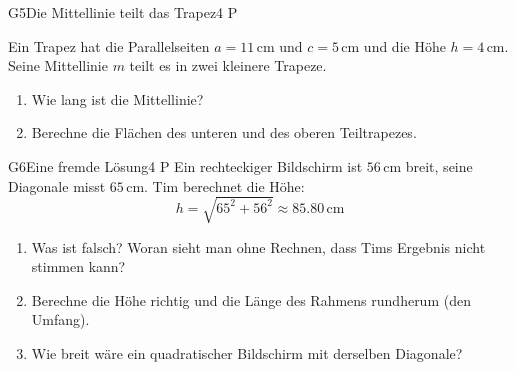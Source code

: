 \documentclass[11pt]{article}
\begin{document}
\begin{lpaufgabe}{G5}{Die Mittellinie teilt das Trapez}{4 P}
\begin{minipage}[t]{0.56\linewidth}\vspace{0pt}
Ein Trapez hat die Parallelseiten $a = 11\,\text{cm}$ und $c = 5\,\text{cm}$ und die Höhe $h = 4\,\text{cm}$. Seine
Mittellinie $m$ teilt es in zwei kleinere Trapeze.
\begin{enumerate}[label=(\alph*),leftmargin=*,itemsep=2pt]
\item Wie lang ist die Mittellinie?
\item Berechne die Flächen des unteren und des oberen Teiltrapezes.
\end{enumerate}
\end{minipage}\hfill
\begin{minipage}[t]{0.40\linewidth}\vspace{0pt}\centering
{}
\end{minipage}
\end{lpaufgabe}

\begin{lpaufgabe}{G6}{Eine fremde Lösung}{4 P}
Ein rechteckiger Bildschirm ist $56\,\text{cm}$ breit, seine Diagonale misst $65\,\text{cm}$. Tim berechnet die Höhe:
\[ h = \sqrt{65^2 + 56^2} \approx 85.80\,\text{cm} \]
\begin{enumerate}[label=(\alph*),leftmargin=*,itemsep=2pt]
\item Was ist falsch? Woran sieht man ohne Rechnen, dass Tims Ergebnis nicht stimmen kann?
\item Berechne die Höhe richtig und die Länge des Rahmens rundherum (den Umfang).
\item Wie breit wäre ein quadratischer Bildschirm mit derselben Diagonale?
\end{enumerate}
\end{lpaufgabe}
\end{document}
